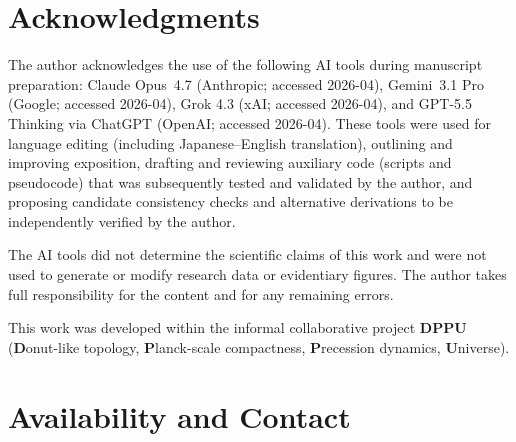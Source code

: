 \documentclass[12pt,a4paper]{article}
\theoremstyle{definition}
\theoremstyle{remark}
\begin{document}

\section*{Acknowledgments}

The author acknowledges the use of the following AI tools during manuscript
preparation: Claude Opus~4.7 (Anthropic; accessed 2026-04),
Gemini~3.1 Pro (Google; accessed 2026-04), Grok 4.3 (xAI; accessed 2026-04),
and GPT-5.5 Thinking via ChatGPT (OpenAI; accessed 2026-04).
These tools were used for language editing (including Japanese--English
translation), outlining and improving exposition, drafting and reviewing
auxiliary code (scripts and pseudocode) that was subsequently tested and
validated by the author, and proposing candidate consistency checks and
alternative derivations to be independently verified by the author.

The AI tools did not determine the scientific claims of this work and were not
used to generate or modify research data or evidentiary figures.  The author
takes full responsibility for the content and for any remaining errors.

This work was developed within the informal collaborative project
\textbf{DPPU} (\textbf{D}onut-like topology, \textbf{P}lanck-scale
compactness, \textbf{P}recession dynamics, \textbf{U}niverse).

\section*{Availability and Contact}
\end{document}
